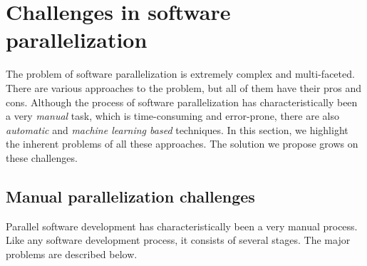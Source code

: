 \section{Challenges in software parallelization}
\label{background_challenges}
\quad The problem of software parallelization is extremely complex and multi-faceted. There are various approaches to the problem, but all of them have their pros and cons. Although the process of software parallelization has characteristically been a very \textit{manual} task, which is time-consuming and error-prone, there are also \textit{automatic} and \textit{machine learning based} techniques. In this section, we highlight the inherent problems of all these approaches. The solution we propose grows on these challenges.
\subsection{Manual parallelization challenges}
\label{background_challenges_manual}
\quad Parallel software development has characteristically been a very manual process. Like any software development process, it consists of several stages. The major problems are described below.

